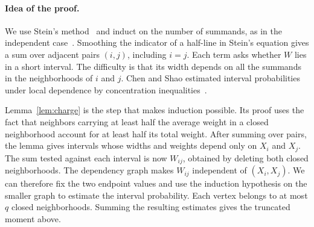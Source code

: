 \paragraph{Idea of the proof.}
We use Stein's method~\cite{Stein72} and induct on the number of summands,
as in the independent case~\cite{Bolthausen,Raic}. Smoothing the indicator
of a half-line in Stein's equation gives a sum over adjacent pairs
$(i,j)$, including $i=j$. Each term asks whether $W$ lies in a short
interval. The difficulty is that its width depends on all the summands
in the neighborhoods of $i$ and $j$. Chen and Shao estimated interval
probabilities under local dependence by concentration inequalities~\cite[Section~3]{ChenShao}.

Lemma~\ref{lem:charge} is the step that makes induction possible.
Its proof uses the fact that neighbors carrying at least half the average
weight in a closed neighborhood account for at least half its total weight.
After summing over pairs, the lemma gives intervals whose
widths and weights depend only on $X_i$ and $X_j$. The sum tested against
each interval is now $W_{ij}$, obtained by deleting both closed
neighborhoods. The dependency graph makes $W_{ij}$ independent of
$(X_i,X_j)$. We can therefore fix the two endpoint values and use the
induction hypothesis on the smaller graph to estimate the interval
probability. Each vertex belongs to at most $q$ closed neighborhoods.
Summing the resulting estimates gives the truncated moment above.

